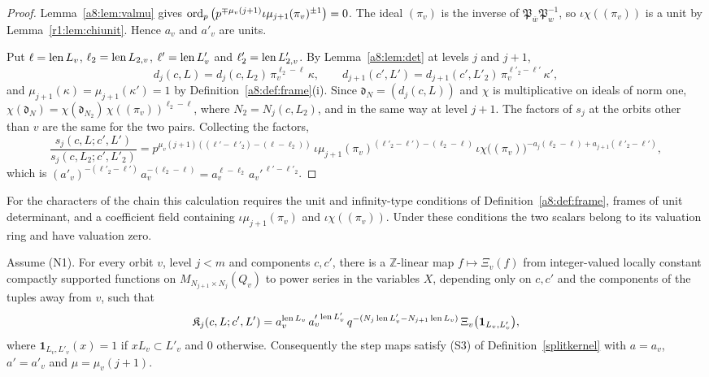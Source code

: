 \begin{proof}
Lemma~\ref{a8:lem:valmu} gives $\operatorname{ord}_p\big(p^{\mp\mu_v(j+1)}\iota\mu_{j+1}(\pi_v)^{\pm1}\big)=0$. The ideal $(\pi_v)$ is the inverse of $\mathfrak P_{\bar w}\mathfrak P_w^{-1}$, so $\iota\chi((\pi_v))$ is a unit by Lemma~\ref{r1:lem:chiunit}. Hence $a_v$ and $a'_v$ are units.

Put $\ell=\operatorname{len} L_v$, $\ell_2=\operatorname{len} L_{2,v}$, $\ell'=\operatorname{len} L'_v$ and $\ell'_2=\operatorname{len} L'_{2,v}$. By Lemma~\ref{a8:lem:det} at levels $j$ and $j+1$,
\[
d_j(c,L)=d_j(c,L_2)\,\pi_v^{\ell_2-\ell}\,\kappa,\qquad d_{j+1}(c',L')=d_{j+1}(c',L'_2)\,\pi_v^{\ell'_2-\ell'}\,\kappa',
\]
and $\mu_{j+1}(\kappa)=\mu_{j+1}(\kappa')=1$ by Definition~\ref{a8:def:frame}(i). Since $\mathfrak d_N=(d_j(c,L))$ and $\chi$ is multiplicative on ideals of norm one, $\chi(\mathfrak d_N)=\chi(\mathfrak d_{N_2})\,\chi((\pi_v))^{\ell_2-\ell}$, where $N_2=N_j(c,L_2)$, and in the same way at level $j+1$. The factors of $s_j$ at the orbits other than $v$ are the same for the two pairs. Collecting the factors,
\[
\frac{s_j(c,L;c',L')}{s_j(c,L_2;c',L'_2)}=p^{\mu_v(j+1)\left((\ell'-\ell'_2)-(\ell-\ell_2)\right)}\,\iota\mu_{j+1}(\pi_v)^{(\ell'_2-\ell')-(\ell_2-\ell)}\,\iota\chi\big((\pi_v)\big)^{-a_j(\ell_2-\ell)+a_{j+1}(\ell'_2-\ell')},
\]
which is $(a'_v)^{-(\ell'_2-\ell')}\,a_v^{-(\ell_2-\ell)}=a_v^{\ell-\ell_2}\,a_v'^{\,\ell'-\ell'_2}$.
\end{proof}

For the characters of the chain this calculation requires the unit and infinity-type conditions of Definition~\ref{a8:def:frame}, frames of unit determinant, and a coefficient field containing $\iota\mu_{j+1}(\pi_v)$ and $\iota\chi((\pi_v))$. Under these conditions the two scalars belong to its valuation ring and have valuation zero.


\begin{proposition}\label{r1:prop:S3}
Assume (N1). For every orbit $v$, level $j<m$ and components $c,c'$, there is a $\mathbb Z$-linear map $f\mapsto\Xi_v(f)$ from integer-valued locally constant compactly supported functions on $M_{N_{j+1}\times N_j}(Q_v)$ to power series in the variables $X$, depending only on $c,c'$ and the components of the tuples away from $v$, such that
\[
\mathfrak K_j(c,L;c',L')=a_v^{\operatorname{len} L_v}\,a_v'^{\,\operatorname{len} L'_v}\,q^{-(N_j\operatorname{len} L'_v-N_{j+1}\operatorname{len} L_v)}\,\Xi_v\big(\mathbf 1_{L_v,L'_v}\big),
\]
where $\mathbf 1_{L_v,L'_v}(x)=1$ if $xL_v\subset L'_v$ and $0$ otherwise. Consequently the step maps satisfy (S3) of Definition~\ref{splitkernel} with $a=a_v$, $a'=a'_v$ and $\mu=\mu_v(j+1)$.
\end{proposition}

